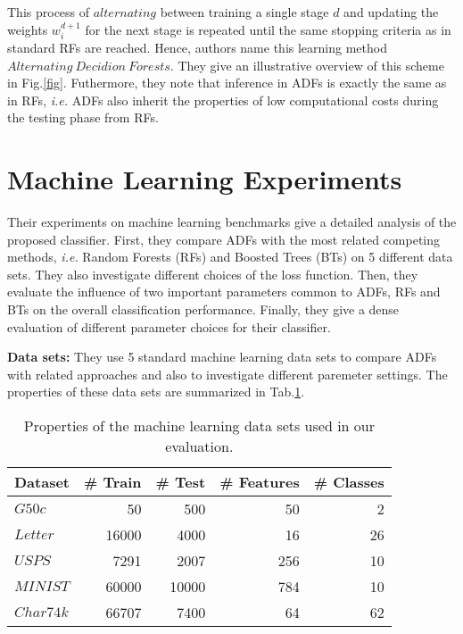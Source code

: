 \documentclass[10pt,twocolumn,letterpaper]{article}
\begin{document}
This process of $alternating$ between training a single stage $d$ and updating the weights $w_i^{d+1}$ for the next stage is repeated until the same stopping criteria as in standard RFs are reached. Hence, authors name this learning method $Alternating~Decidion~Forests$. They give an illustrative overview of this scheme in Fig.\ref{fig}. Futhermore, they note that inference in ADFs is exactly the same as in RFs, \emph{i.e.} ADFs also inherit the properties of low computational costs during the testing phase from RFs. 

\section{Machine Learning Experiments}

Their experiments on machine learning benchmarks give a detailed analysis of the proposed classifier. First, they compare ADFs with the most related competing methods, \emph{i.e.} Random Forests (RFs) and Boosted Trees (BTs) on 5 different data sets. They also investigate different choices of the loss function. Then, they evaluate the influence of two important parameters common to ADFs, RFs and BTs on the overall classification performance. Finally, they give a dense evaluation of different parameter choices for their classifier.

{\bf Data sets:} They use 5 standard machine learning data sets to compare ADFs with related approaches and also to investigate different paremeter settings. The properties of these data sets are summarized in Tab.\ref{tab}.
\begin{table}
\begin{center}
\begin{tabular}{lrrrr}
  \hline
  Dataset & \# Train & \# Test & \# Features & \# Classes \\
  \hline
  $G50c$ & 50 & 500 & 50 & 2 \\
  $Letter$ & 16000 & 4000 & 16 & 26 \\
  $USPS$ & 7291 & 2007 & 256 & 10 \\
  $MINIST$ & 60000 & 10000 & 784 & 10 \\
  $Char74k$ & 66707 & 7400 & 64 & 62 \\
  \hline
 \end{tabular}
\end{center}
\caption{Properties of the machine learning data sets used in our evaluation.}
\label{tab}
\end{table}

{\small


}
\end{document}
